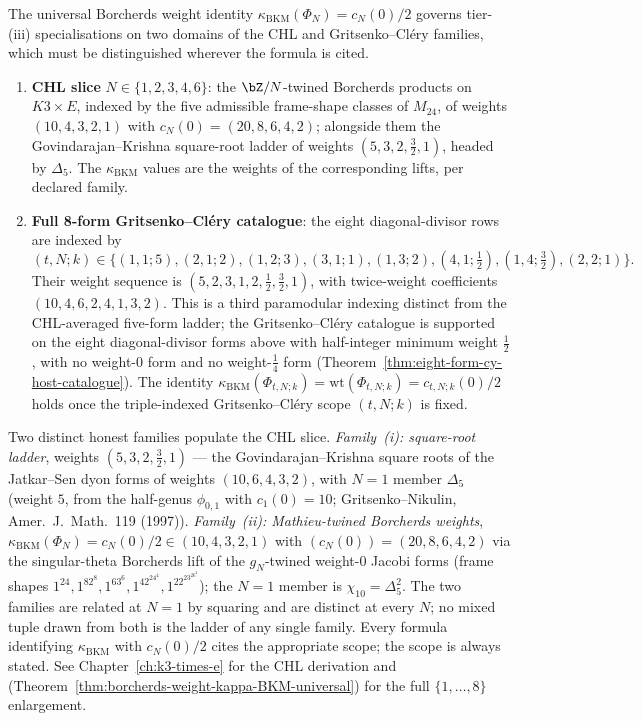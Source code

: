\begin{remark}[Two scopes for \texorpdfstring{$\kappa_{\mathrm{BKM}}(\Phi_N) = c_N(0)/2$}{kappa-BKM(Phi-N) = c-N(0)/2}]
\label{rem:cy-kappa-bkm-two-scopes-opener}
The universal Borcherds weight identity $\kappa_{\mathrm{BKM}}(\Phi_N) = c_N(0)/2$
governs tier-(iii) specialisations on two domains of the CHL and
Gritsenko--Cléry families, which must be distinguished wherever the
formula is cited.
\begin{enumerate}[label=\textup{(\roman*)},leftmargin=2.4em]
\item \textbf{CHL slice} $N \in \{1, 2, 3, 4, 6\}$: the
$\bZ/N$-twined Borcherds products on $K3 \times E$, indexed by the
five admissible frame-shape classes of $M_{24}$, of weights
$(10, 4, 3, 2, 1)$ with $c_N(0) = (20, 8, 6, 4, 2)$; alongside them
the Govindarajan--Krishna square-root ladder of weights
$(5, 3, 2, \tfrac32, 1)$, headed by $\Delta_5$. The
$\kappa_{\mathrm{BKM}}$ values are the weights of the corresponding
lifts, per declared family.
\item \textbf{Full 8-form Gritsenko--Cléry catalogue}:
the eight diagonal-divisor rows are indexed by
\[
(t,N;k)\in\{(1,1;5),(2,1;2),(1,2;3),(3,1;1),
(1,3;2),(4,1;\tfrac12),(1,4;\tfrac32),(2,2;1)\}.
\]
Their weight sequence is
$(5,2,3,1,2,\tfrac12,\tfrac32,1)$, with twice-weight
coefficients $(10,4,6,2,4,1,3,2)$. This is a third paramodular
indexing distinct from the CHL-averaged five-form ladder; the
Gritsenko--Cl\'ery catalogue is supported on the eight
diagonal-divisor forms above with half-integer minimum weight
$\tfrac12$, with no weight-$0$ form and no weight-$\tfrac14$ form
(Theorem~\ref{thm:eight-form-cy-host-catalogue}). The identity
$\kappa_{\mathrm{BKM}}(\Phi_{t,N;k})=\mathrm{wt}(\Phi_{t,N;k})=c_{t,N;k}(0)/2$ holds once
the triple-indexed Gritsenko--Cl\'ery scope $(t,N;k)$ is fixed.
\end{enumerate}
Two distinct honest families populate the CHL slice. \emph{Family~(i): square-root ladder}, weights $(5, 3, 2, \tfrac32, 1)$ --- the Govindarajan--Krishna square roots of the Jatkar--Sen dyon forms of weights $(10, 6, 4, 3, 2)$, with $N = 1$ member $\Delta_5$ (weight $5$, from the half-genus $\phi_{0,1}$ with $c_1(0) = 10$; Gritsenko--Nikulin, Amer.~J.~Math.~119 (1997)). \emph{Family~(ii): Mathieu-twined Borcherds weights}, $\kappa_{\mathrm{BKM}}(\Phi_N) = c_N(0)/2 \in (10, 4, 3, 2, 1)$ with $(c_N(0)) = (20, 8, 6, 4, 2)$ via the singular-theta Borcherds lift of the $g_N$-twined weight-$0$ Jacobi forms (frame shapes $1^{24}, 1^82^8, 1^63^6, 1^42^24^4, 1^22^23^26^2$); the $N = 1$ member is $\chi_{10} = \Delta_5^2$. The two families are related at $N = 1$ by squaring and are distinct at every $N$; no mixed tuple drawn from both is the ladder of any single family.
Every formula identifying $\kappa_{\mathrm{BKM}}$ with $c_N(0)/2$ cites
the appropriate scope; the scope is always stated. See
Chapter~\ref{ch:k3-times-e} for the CHL derivation and
\cite{VolI}
(Theorem~\ref{thm:borcherds-weight-kappa-BKM-universal}) for the
full $\{1, \ldots, 8\}$ enlargement.
\end{remark}


